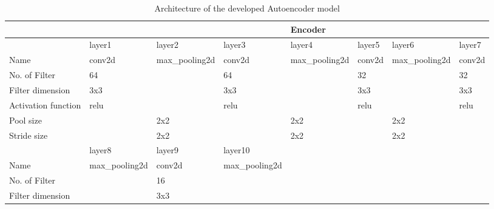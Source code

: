 \documentclass[conference]{IEEEtran}
\begin{document}
\begin{table}[!t]
	\centering
	\caption{Architecture of the developed Autoencoder model}
	\label{tab:archi}
	\begin{tabular}{llllllll}
		\hline
		&                  &                  &                  & Encoder          &                  &                &                  \\ \hline
		& layer1           & layer2           & layer3           & layer4           & layer5           & layer6         & layer7           \\ \hline
		Name                & conv2d           & max\_pooling2d   & conv2d           & max\_pooling2d   & conv2d           & max\_pooling2d & conv2d           \\ \hline
		No. of Filter       & 64               &                  & 64               &                  & 32               &                & 32               \\ \hline
		Filter dimension    & 3x3              &                  & 3x3              &                  & 3x3              &                & 3x3              \\ \hline
		Activation function & relu             &                  & relu             &                  & relu             &                & relu             \\ \hline
		Pool size           &                  & 2x2              &                  & 2x2              &                  & 2x2            &                  \\ \hline
		Stride size         &                  & 2x2              &                  & 2x2              &                  & 2x2            &                  \\ \hline
		& layer8           & layer9           & layer10          &                  &                  &                &                  \\ \hline
		Name                & max\_pooling2d   & conv2d           & max\_pooling2d   &                  &                  &                &                  \\ \hline
		No. of Filter       &                  & 16               &                  &                  &                  &                &                  \\ \hline
		Filter dimension    &                  & 3x3              &                  &                  &                  &                &                  \\ \hline

\end{tabular}
\end{table}
\end{document}
